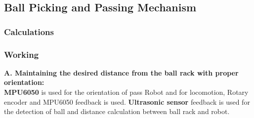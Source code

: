     \subsection{Ball Picking and Passing Mechanism}
        \subsubsection{Calculations}


        \subsubsection{Working}
            \textbf{A. Maintaining the desired distance from the ball rack with proper orientation:}                                   \\
            \textbf{MPU6050} is used for the orientation of pass Robot and for locomotion, Rotary encoder and MPU6050 feedback is used. \textbf{Ultrasonic sensor} 
            feedback is used for the detection of ball and distance calculation between ball rack and robot.                                                                                                                     \\

